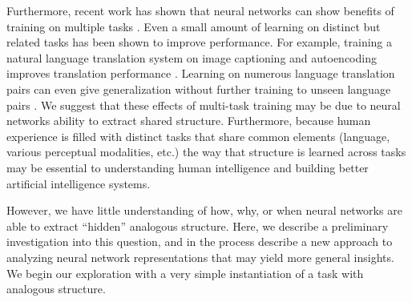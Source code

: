 \documentclass[10pt,letterpaper]{article}
\begin{document}
Furthermore, recent work has shown that neural networks can show benefits of training on multiple tasks \cite[e.g.]{Dong2015,Rusu2015}. Even a small amount of learning on distinct but related tasks has been shown to improve performance. For example, training a natural language translation system on image captioning and autoencoding improves translation performance \citep{Luong2016}. Learning on numerous language translation pairs can even give generalization without further training to unseen language pairs \citep{Johnson2016a}. We suggest that these effects of multi-task training may be due to neural networks ability to extract shared structure. Furthermore, because human experience is filled with distinct tasks that share common elements (language, various perceptual modalities, etc.) the way that structure is learned across tasks may be essential to understanding human intelligence and building better artificial intelligence systems.\par
However, we have little understanding of how, why, or when neural networks are able to extract ``hidden'' analogous structure. Here, we describe a preliminary investigation into this question, and in the process describe a new approach to analyzing neural network representations that may yield more general insights. We begin our exploration with a very simple instantiation of a task with analogous structure. \par 
\end{document}
